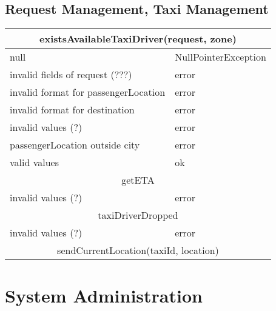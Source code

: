 \documentclass[11pt,oneside,a4paper]{report}
\begin{document}
\section{Request Management, Taxi Management}
\begin{tabular}{p{5cm}|p{6cm}}
\hline
	\multicolumn{2}{c}{existsAvailableTaxiDriver(request, zone)}\\\hline
	null &
	NullPointerException \\\hline
	invalid fields of request (???) &
	error \\\hline
	invalid format for passengerLocation &
	error \\\hline
	invalid format for destination &
	error \\\hline
	invalid values (?) &
	error \\\hline
	passengerLocation outside city &
	error \\\hline
	valid values &
	ok \\\hline\hline
	
	\multicolumn{2}{c}{getETA}\\\hline
	invalid values (?) &
	error \\\hline\hline

	\multicolumn{2}{c}{taxiDriverDropped}\\\hline
	invalid values (?) &
	error \\\hline
	
	\multicolumn{2}{c}{	sendCurrentLocation(taxiId, location)}\\\hline

	
\end{tabular}


\chapter{System Administration}
\end{document}
